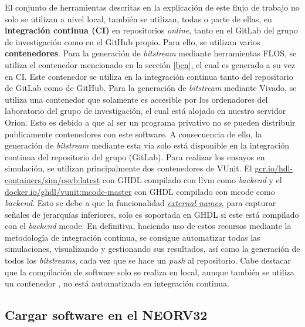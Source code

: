 El conjunto de herramientas descritas en la explicación de este flujo de trabajo no solo se utilizan a nivel local, también se utilizan, todas o parte de ellas, en \textbf{integración continua (CI)} en repositorios \textit{online}, tanto en el GitLab del grupo de investigación como en el GitHub propio.
Para ello, se utilizan varios \textbf{contenedores}.
Para la generación de \textit{bitstream} mediante herramientas FLOS, se utiliza el contenedor mencionado en la sección \ref{ben}, el cual es generado a su vez en CI.
Este contenedor se utiliza en la integración continua tanto del repositorio de GitLab como de GitHub.
Para la generación de \textit{bitstream} mediante Vivado, se utiliza una contenedor que solamente es accesible por los ordenadores del laboratorio del grupo de investigación, el cual está alojado en nuestro servidor Orion.
Esto es debido a que al ser un programa privativo no se pueden distribuir publicamente contenedores con este software. A consecuencia de ello, la generación de \textit{bitstream} mediante esta vía solo está disponible en la integración continua del repositorio del grupo (GitLab).
Para realizar los ensayos en simulación, se utilizan principalmente dos contenedores de VUnit.
El \href{https://console.cloud.google.com/gcr/images/hdl-containers/global/sim/osvb}{gcr.io/hdl-containers/sim/osvb:latest} con GHDL compilado con llvm como \textit{backend} y el \href{https://hub.docker.com/layers/ghdl/vunit/mcode-master/images/sha256-e32029c5be70a5fa0fc94bffd15d72fa8b84ad8aaf2dc7cfa8ab8324ef733ed0?context=explore}{docker.io/ghdl/vunit:mcode-master} con GHDL compilado con mcode como \textit{backend}.
Esto se debe a que la funcionalidad \href{https://github.com/stnolting/neorv32/discussions/886}{\textit{external names}}, para capturar señales de jerarquías inferiores, solo es soportada en GHDL si este está compilado con el \textit{backend} mcode.
En definitiva, haciendo uso de estos recursos mediante la metodología de integración continua, se consigue automatizar todas las simulaciones, visualizando y gestionando sus resultados, así como la generación de todos los \textit{bitstreams}, cada vez que se hace un \textit{push} al repositorio.
Cabe destacar que la compilación de software solo se realiza en local, aunque también se utiliza un contenedor \cite{gh:sim-conatiner}, no está automatizada en integración continua.

\subsection{Cargar software en el NEORV32}

